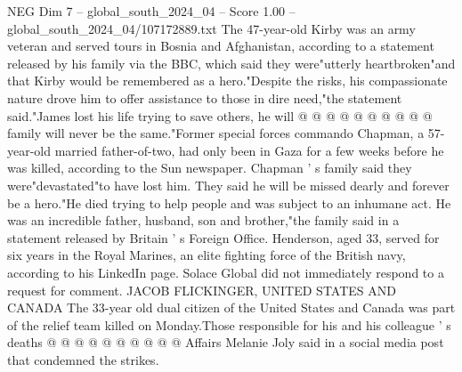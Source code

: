 \begin{textsample}{NEG Dim 7 – global\_south\_2024\_04 – Score 1.00 – global\_south\_2024\_04/107172889.txt}
The 47-year-old Kirby was an army veteran and served tours in Bosnia and Afghanistan, according to a statement released by his family via the BBC, which said they were"utterly heartbroken"and that Kirby would be remembered as a hero."Despite the risks, his compassionate nature drove him to offer assistance to those in dire need,"the statement said."James lost his life trying to save others, he will @ @ @ @ @ @ @ @ @ @ family will never be the same."Former special forces commando Chapman, a 57-year-old married father-of-two, had only been in Gaza for a few weeks before he was killed, according to the Sun newspaper.
Chapman ' s family said they were"devastated"to have lost him.
They said he will be missed dearly and forever be a hero."He died trying to help people and was subject to an inhumane act.
He was an incredible father, husband, son and brother,"the family said in a statement released by Britain ' s Foreign Office.
Henderson, aged 33, served for six years in the Royal Marines, an elite fighting force of the British navy, according to his LinkedIn page.
Solace Global did not immediately respond to a request for comment.
JACOB FLICKINGER, UNITED STATES AND CANADA The 33-year old dual citizen of the United States and Canada was part of the relief team killed on Monday.Those responsible for his and his colleague ' s deaths @ @ @ @ @ @ @ @ @ @ Affairs Melanie Joly said in a social media post that condemned the strikes.

\end{textsample}
